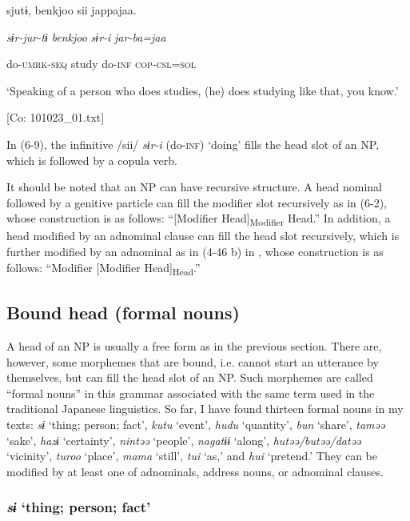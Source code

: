     sjutɨ,  {\textbar}benkjoo{\textbar}  sii  jappajaa.

    \textit{sɨr-jur-tɨ}  \textit{benkjoo}  \textit{sɨr-i}  \textit{jar-ba=jaa}

    do-\textsc{umrk}-\textsc{seq}  study  do-\textsc{inf}  \textsc{cop}-\textsc{csl}=\textsc{sol}

    ‘Speaking of a person who does studies, (he) does studying like that, you know.’

    [Co: 101023\_01.txt]

In (6-9), the infinitive /sii/ \textit{sɨr-i} (do-\textsc{inf}) ‘doing’ fills the head slot of an NP, which is followed by a copula verb.

It should be noted that an NP can have recursive structure. A head nominal followed by a genitive particle can fill the modifier slot recursively as in (6-2), whose construction is as follows: “[Modifier Head]\textsubscript{Modifier} Head.” In addition, a head modified by an adnominal clause can fill the head slot recursively, which is further modified by an adnominal as in (4-46 b) in , whose construction is as follows: “Modifier [Modifier Head]\textsubscript{Head}.”

\subsection{Bound head (formal nouns)}

A head of an NP is usually a free form as in the previous section. There are, however, some morphemes that are bound, i.e. cannot start an utterance by themselves, but can fill the head slot of an NP. Such morphemes are called “formal nouns” in this grammar associated with the same term used in the traditional Japanese linguistics. So far, I have found thirteen formal nouns in my texts: \textit{sɨ} ‘thing; person; fact’, \textit{kutu} ‘event’, \textit{hudu} ‘quantity’, \textit{bun} ‘share’, \textit{taməə} ‘sake’, \textit{hazɨ} ‘certainty’, \textit{nintəə} ‘people’, \textit{nagatɨɨ} ‘along’, \textit{hutəə/butəə/datəə} ‘vicinity’, \textit{turoo} ‘place’, \textit{mama} ‘still’, \textit{tui} ‘as,’ and \textit{hui} ‘pretend.’ They can be modified by at least one of adnominals, address nouns, or adnominal clauses.

\subsubsection{\textit{sɨ} ‘thing; person; fact’}

